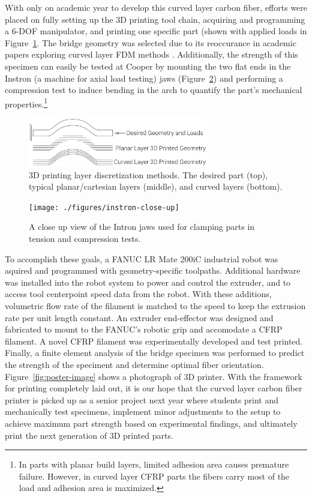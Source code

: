 With only on academic year to develop this curved layer carbon fiber, efforts were placed on fully setting up the 3D printing tool chain, acquiring and programming a 6-DOF manipulator, and printing one specific part (shown with applied loads in Figure~\ref{fig:intro-layers-geometry-loads}. The bridge geometry was selected due to its reoccurance in academic papers exploring curved layer FDM methods \cite{cute-curves}. Additionally, the strength of this specimen can easily be tested at Cooper by mounting the two flat ends in the Instron (a machine for axial load testing) jaws (Figure~\ref{fig:instron-close-up}) and performing a compression test to induce bending in the arch to quantify the part's mechanical properties.\footnote{In parts with planar build layers, limited adhesion area causes premature failure. However, in curved layer CFRP parts the fibers carry most of the load and adhesion area is maximized.}\\

\begin{figure}[h!]
\centering
\includegraphics[width=0.7\textwidth]{./figures/intro-layers-geometry-loads}
\caption{3D printing layer discretization methods. The desired part (top), typical planar/cartesian layers (middle), and curved layers (bottom).}
\label{fig:intro-layers-geometry-loads}
\end{figure}

\begin{figure}[h!]
\centering
\texttt{[image: ./figures/instron-close-up]}
\caption{A close up view of the Intron jaws used for clamping parts in tension and compression tests.}
\label{fig:instron-close-up}
\end{figure}

To accomplish these goals, a FANUC LR Mate 200iC industrial robot was aquired and programmed with geometry-specific toolpaths. Additional hardware was installed into the robot system to power and control the extruder, and to access tool centerpoint speed data from the robot. With these additions, volumetric flow rate of the filament is matched to the speed to keep the extrusion rate per unit length constant. An extruder end-effector was designed and fabricated to mount to the FANUC's robotic grip and accomodate a CFRP filament. A novel CFRP filament was experimentally developed and test printed. Finally, a finite element analysis of the bridge specimen was performed to predict the strength of the speciment and determine optimal fiber orientation. Figure~\ref{fig:poster-image} shows a photograph of 3D printer. With the framework for printing completely laid out, it is our hope that the curved layer carbon fiber printer is picked up as a senior project next year where students print and mechanically test specimens, implement minor adjustments to the setup to achieve maximum part strength based on experimental findings, and ultimately print the next generation of 3D printed parts.

